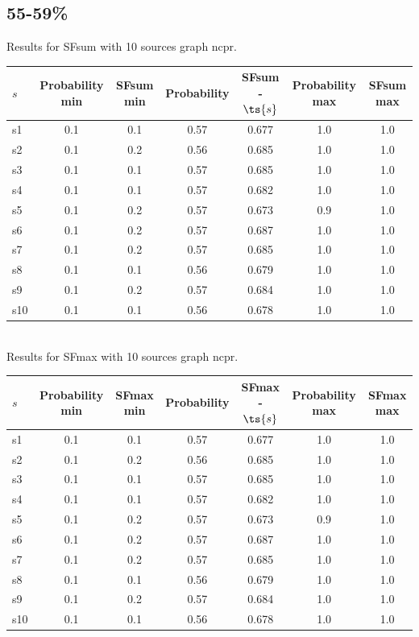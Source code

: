 \documentclass{article}
\begin{document}
\newpage

\subsection{55-59\%}

\noindent Results for SFsum with 10 sources graph ncpr.

\noindent\begin{tabular}{|l|c|c|c|c|c|c|}
\hline
$s$& Probability min & SFsum min & Probability & SFsum - $\ts{s}$ & Probability max & SFsum max\\
\hline
s1 &0.1 & 0.1 & 0.57 & 0.677 & 1.0 & 1.0\\
\hline
s2 &0.1 & 0.2 & 0.56 & 0.685 & 1.0 & 1.0\\
\hline
s3 &0.1 & 0.1 & 0.57 & 0.685 & 1.0 & 1.0\\
\hline
s4 &0.1 & 0.1 & 0.57 & 0.682 & 1.0 & 1.0\\
\hline
s5 &0.1 & 0.2 & 0.57 & 0.673 & 0.9 & 1.0\\
\hline
s6 &0.1 & 0.2 & 0.57 & 0.687 & 1.0 & 1.0\\
\hline
s7 &0.1 & 0.2 & 0.57 & 0.685 & 1.0 & 1.0\\
\hline
s8 &0.1 & 0.1 & 0.56 & 0.679 & 1.0 & 1.0\\
\hline
s9 &0.1 & 0.2 & 0.57 & 0.684 & 1.0 & 1.0\\
\hline
s10 &0.1 & 0.1 & 0.56 & 0.678 & 1.0 & 1.0\\
\hline
\end{tabular}\\

\noindent Results for SFmax with 10 sources graph ncpr.

\noindent\begin{tabular}{|l|c|c|c|c|c|c|}
\hline
$s$& Probability min & SFmax min & Probability & SFmax - $\ts{s}$ & Probability max & SFmax max\\
\hline
s1 &0.1 & 0.1 & 0.57 & 0.677 & 1.0 & 1.0\\
\hline
s2 &0.1 & 0.2 & 0.56 & 0.685 & 1.0 & 1.0\\
\hline
s3 &0.1 & 0.1 & 0.57 & 0.685 & 1.0 & 1.0\\
\hline
s4 &0.1 & 0.1 & 0.57 & 0.682 & 1.0 & 1.0\\
\hline
s5 &0.1 & 0.2 & 0.57 & 0.673 & 0.9 & 1.0\\
\hline
s6 &0.1 & 0.2 & 0.57 & 0.687 & 1.0 & 1.0\\
\hline
s7 &0.1 & 0.2 & 0.57 & 0.685 & 1.0 & 1.0\\
\hline
s8 &0.1 & 0.1 & 0.56 & 0.679 & 1.0 & 1.0\\
\hline
s9 &0.1 & 0.2 & 0.57 & 0.684 & 1.0 & 1.0\\
\hline
s10 &0.1 & 0.1 & 0.56 & 0.678 & 1.0 & 1.0\\
\hline
\end{tabular}\\
\end{document}
